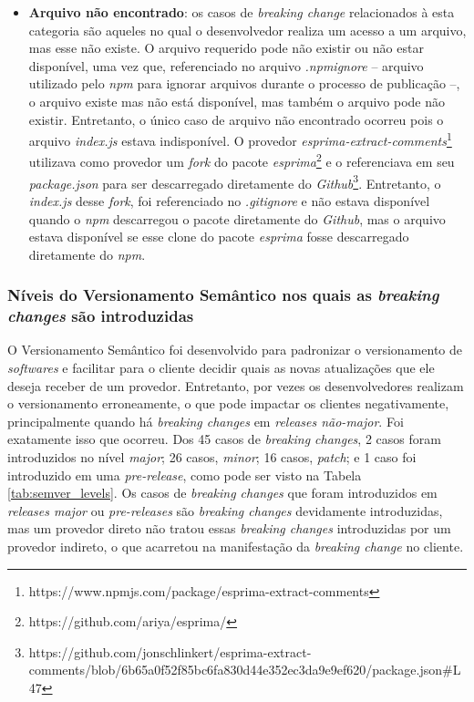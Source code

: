 \begin{itemize}
    \item \textbf{Arquivo não encontrado}: os casos de \textit{breaking change} relacionados à esta categoria são aqueles no qual o desenvolvedor realiza um acesso a um arquivo, mas esse não existe. O arquivo requerido pode não existir ou não estar disponível, uma vez que, referenciado no arquivo \textit{.npmignore} -- arquivo utilizado pelo \textit{npm} para ignorar arquivos durante o processo de publicação --, o arquivo existe mas não está disponível, mas também o arquivo pode não existir. Entretanto, o único caso de arquivo não encontrado ocorreu pois o arquivo \textit{index.js} estava indisponível. O provedor \textit{esprima-extract-comments}\footnote{https://www.npmjs.com/package/esprima-extract-comments} utilizava como provedor um \textit{fork} do pacote \textit{esprima}\footnote{https://github.com/ariya/esprima/} e o referenciava em seu  \textit{package.json} para ser descarregado diretamente do \textit{Github}\footnote{https://github.com/jonschlinkert/esprima-extract-comments/blob/6b65a0f52f85bc6fa830d44e352ec3da9e9ef620/package.json\#L47}. Entretanto, o \textit{index.js} desse \textit{fork}, foi referenciado no \textit{.gitignore} e não estava disponível quando o \textit{npm} descarregou o pacote diretamente do \textit{Github}, mas o arquivo estava disponível se esse clone do pacote \textit{esprima} fosse descarregado diretamente do \textit{npm}.

\end{itemize}{}

\subsubsection{Níveis do Versionamento Semântico nos quais as \textit{breaking changes} são introduzidas}
O Versionamento Semântico foi desenvolvido para padronizar o versionamento de \textit{softwares} e facilitar para o cliente decidir quais as novas atualizações que ele deseja receber de um provedor. Entretanto, por vezes os desenvolvedores realizam o versionamento erroneamente, o que pode impactar os clientes negativamente, principalmente quando há \textit{breaking changes} em \textit{releases não-major}. Foi exatamente isso que ocorreu. Dos 45 casos de \textit{breaking changes}, 2 casos foram introduzidos no nível \textit{major}; 26 casos, \textit{minor}; 16 casos, \textit{patch}; e 1 caso foi introduzido em uma \textit{pre-release}, como pode ser visto na Tabela \ref{tab:semver_levels}. Os casos de \textit{breaking changes} que foram introduzidos em \textit{releases major} ou \textit{pre-releases} são \textit{breaking changes} devidamente introduzidas, mas um provedor direto não tratou essas \textit{breaking changes} introduzidas por um provedor indireto, o que acarretou na manifestação da \textit{breaking change} no cliente.

